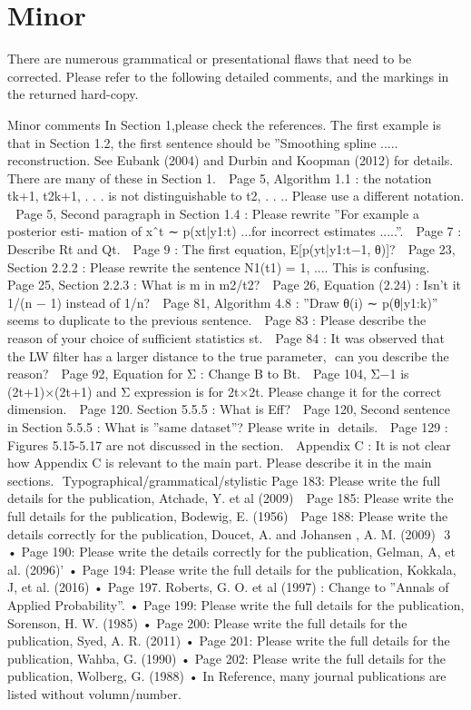 \documentclass[a4paper,18pt]{extarticle}
\begin{document}
\section{Minor}

There are numerous grammatical or presentational flaws that need to be corrected. Please refer to the following detailed comments, and the markings in the returned hard-copy. 

Minor comments 
In Section 1,please check the references. The first example is that in Section 1.2, the first sentence should be ”Smoothing spline ..... reconstruction. See Eubank (2004) and Durbin and Koopman (2012) for details. There are many of these in Section 1.  
Page 5, Algorithm 1.1 : the notation tk+1, t2k+1, . . . is not distinguishable to t2, . . .. Please use a different notation.  
Page 5, Second paragraph in Section 1.4 : Please rewrite ”For example a posterior esti- mation of xˆt ∼ p(xt|y1:t) ...for incorrect estimates .....”.  
Page 7 : Describe Rt and Qt.  
Page 9 : The first equation, E[p(yt|y1:t−1, θ)]?  
Page 23, Section 2.2.2 : Please rewrite the sentence N1(t1) = 1, .... This is confusing.  
Page 25, Section 2.2.3 : What is m in m2/t2?  
Page 26, Equation (2.24) : Isn’t it 1/(n − 1) instead of 1/n?  
Page 81, Algorithm 4.8 : ”Draw θ(i) ∼ p(θ|y1:k)” seems to duplicate to the previous sentence.  
Page 83 : Please describe the reason of your choice of sufficient statistics st.  
Page 84 : It was observed that the LW filter has a larger distance to the true parameter,  can you describe the reason?  
Page 92, Equation for Σ : Change B to Bt.  
Page 104, Σ−1 is (2t+1)×(2t+1) and Σ expression is for 2t×2t. Please change it for the correct dimension.  
Page 120. Section 5.5.5 : What is Eff?  
Page 120, Second sentence in Section 5.5.5 : What is ”same dataset”? Please write in  details.  
Page 129 : Figures 5.15-5.17 are not discussed in the section.  
Appendix C : It is not clear how Appendix C is relevant to the main part. Please describe it in the main sections.  Typographical/grammatical/stylistic 
Page 183: Please write the full details for the publication, Atchade, Y. et al (2009)  
Page 185: Please write the full details for the publication, Bodewig, E. (1956)  
Page 188: Please write the details correctly for the publication, Doucet, A. and Johansen , A. M. (2009)  3  
• Page 190: Please write the details correctly for the publication, Gelman, A, et al. (2096)’ • Page 194: Please write the full details for the publication, Kokkala, J, et al. (2016) • Page 197. Roberts, G. O. et al (1997) : Change to ”Annals of Applied Probability”. • Page 199: Please write the full details for the publication, Sorenson, H. W. (1985) 
• Page 200: Please write the full details for the publication, Syed, A. R. (2011) • Page 201: Please write the full details for the publication, Wahba, G. (1990) • Page 202: Please write the full details for the publication, Wolberg, G. (1988) • In Reference, many journal publications are listed without volumn/number. 
\end{document}
